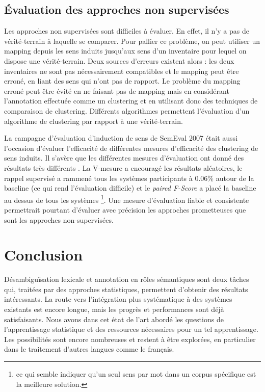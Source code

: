 \subsection{Évaluation des approches non supervisées}
\label{evalunsupervised}

Les approches non supervisées sont difficiles à évaluer. En effet, il n'y a pas de vérité-terrain à laquelle se comparer. Pour pallier ce problème, on peut utiliser un mapping depuis les sens induits jusqu'aux sens d'un inventaire pour lequel on dispose une vérité-terrain. Deux sources d'erreurs existent alors : les deux inventaires ne sont pas nécessairement compatibles et le mapping peut être erroné, en liant des sens qui n'ont pas de rapport. Le problème du mapping erroné peut être évité en ne faisant pas de mapping mais en considérant l'annotation effectuée comme un clustering et en utilisant donc des techniques de comparaison de clustering. Différents algorithmes permettent l'évaluation d'un algorithme de clustering par rapport à une vérité-terrain.

La campagne d'évaluation d'induction de sens de SemEval 2007 \citep{manandhar2010semeval} était aussi l'occasion d'évaluer l'efficacité de différentes mesures d'efficacité des clustering de sens induits. Il s'avère que les différentes mesures d'évaluation ont donné des résultats très différents \citep{pedersen2010duluth}. La V-mesure a encouragé les résultats aléatoires, le rappel supervisé a rammené tous les systèmes participants à 0.06\% autour de la baseline (ce qui rend l'évaluation difficile) et le \textit{paired F-Score} a placé la baseline au dessus de tous les systèmes \footnote{ce qui semble indiquer qu'un seul sens par mot dans un corpus spécifique est la meilleure solution.}. Une mesure d'évaluation fiable et consistente permettrait pourtant d'évaluer avec précision les approches prometteuses que sont les approches non-supervisées.

\section{Conclusion}

Désambiguïsation lexicale et annotation en rôles sémantiques sont deux tâches qui, traitées par des approches statistiques, permettent d'obtenir des résultats intéressants. La route vers l'intégration plus systématique à des systèmes existants est encore longue, mais les progrès et performances sont déjà satisfaisants. Nous avons dans cet état de l'art abordé les questions de l'apprentissage statistique et des ressources nécessaires pour un tel apprentissage. Les possibilités sont encore nombreuses et restent à être explorées, en particulier dans le traitement d'autres langues comme le français.
